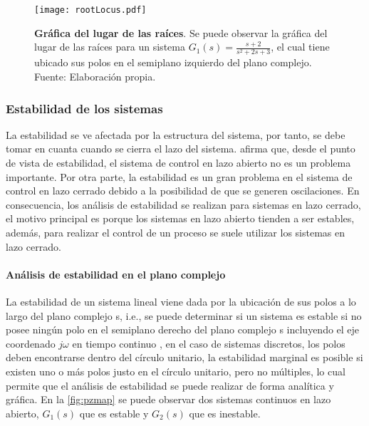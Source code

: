             \begin{figure}[htb]
                \centering
                \texttt{[image: rootLocus.pdf]}
                \caption[Ejemplo de gráfica del lugar de las raíces]{\textbf{Gráfica del lugar de las raíces}. Se puede observar la gráfica del lugar de las raíces para un sistema $G_1(s) = \frac{s + 2}{s^2 + 2s + 3}$, el cual tiene ubicado sus polos en el semiplano izquierdo del plano complejo. Fuente: Elaboración propia.} 
                \label{fig:rootLocus}
            \end{figure}

        \subsubsection{Estabilidad de los sistemas}

            La estabilidad se ve afectada por la estructura del sistema, por tanto, se debe tomar en cuanta cuando se cierra el lazo del sistema. \textcite{ogata2003ingenieria} afirma que, desde el punto de vista de estabilidad, el sistema de control en lazo abierto no es un problema importante. Por otra parte, la estabilidad es un gran problema en el sistema de control en lazo cerrado debido a la posibilidad de que se generen oscilaciones. En consecuencia, los análisis de estabilidad se realizan para sistemas en lazo cerrado, el motivo principal es porque los sistemas en lazo abierto tienden a ser estables, además, para realizar el control de un proceso se suele utilizar los sistemas en lazo cerrado.

            \paragraph{Análisis de estabilidad en el plano complejo}
            
                La estabilidad de un sistema lineal viene dada por la ubicación de sus polos a lo largo del plano complejo s, i.e., se puede determinar si un sistema es estable si no posee ningún polo en el semiplano derecho del plano complejo s incluyendo el eje coordenado $j\omega$ en tiempo continuo \Parencite{ogata2003ingenieria}, en el caso de sistemas discretos, los polos deben encontrarse dentro del círculo unitario, la estabilidad marginal es posible si existen uno o más polos justo en el círculo unitario, pero no múltiples, lo cual permite que el análisis de estabilidad se puede realizar de forma analítica y gráfica. En la \cref{fig:pzmap} se puede observar dos sistemas continuos en lazo abierto, $G_1(s)$ que es estable y $G_2(s)$ que es inestable.

